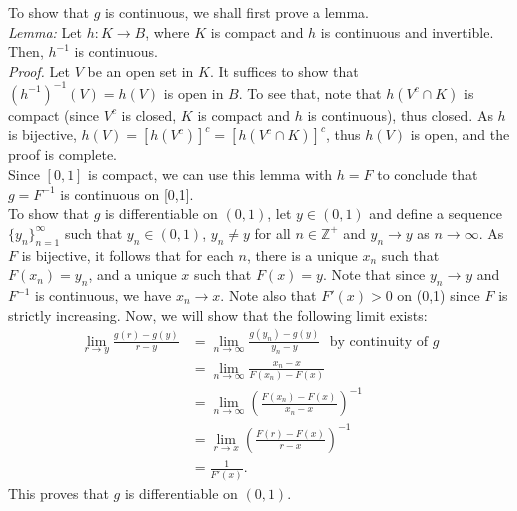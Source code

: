 \documentclass{article}
\begin{document}
To show that $g$ is continuous, we shall first prove a lemma. \\
\textit{Lemma:} Let $h:K \to B$, where $K$ is compact and $h$ is continuous and invertible. Then, $h^{-1}$ is continuous. \\
\textit{Proof.} Let $V$ be an open set in $K$. It suffices to show that $(h^{-1})^{-1}(V) = h(V)$ is open in $B$. To see that, note that $h(V^c \cap K)$ is compact (since $V^c$ is closed, $K$ is compact and $h$ is continuous), thus closed. As $h$ is bijective, $h(V) = [h(V^c)]^c = [h(V^c \cap K)]^c$, thus $h(V)$ is open, and the proof is complete. \\
Since $[0, 1]$ is compact, we can use this lemma with $h=F$ to conclude that $g=F^{-1}$ is continuous on [0,1]. \\
\linebreak
To show that $g$ is differentiable on $(0, 1)$, let $y \in (0, 1)$ and define a sequence $\{y_n\}_{n=1}^\infty$ such that $y_n \in (0, 1)$, $y_n \neq y$ for all $n \in \mathbb{Z}^+$ and $y_n \to y$ as $n \to \infty$. As $F$ is bijective, it follows that for each $n$, there is a unique $x_n$ such that $F(x_n) = y_n$, and a unique $x$ such that $F(x)=y$. Note that since $y_n\to y$ and $F^{-1}$ is continuous, we have $x_n\to x$. Note also that $F'(x)>0$ on (0,1) since $F$ is strictly increasing. Now, we will show that the following limit exists:
\begin{align*}
    \lim_{r \to y} \frac{g(r) - g(y)}{r - y} &= \lim_{n \to \infty} \frac{g(y_n) - g(y)}{y_n - y} \ \ \ \text{by continuity of }g\\
    &= \lim_{n \to \infty} \frac{x_n - x}{F(x_n) - F(x)} \\
    &= \lim_{n \to \infty} \left( \frac{F(x_n) - F(x)}{x_n - x} \right)^{-1} \\
    &= \lim_{r \to x} \left( \frac{F(r) - F(x)}{r - x} \right)^{-1} \\
    &= \frac{1}{F'(x)}.
\end{align*}
This proves that $g$ is differentiable on $(0, 1)$.
\end{document}

